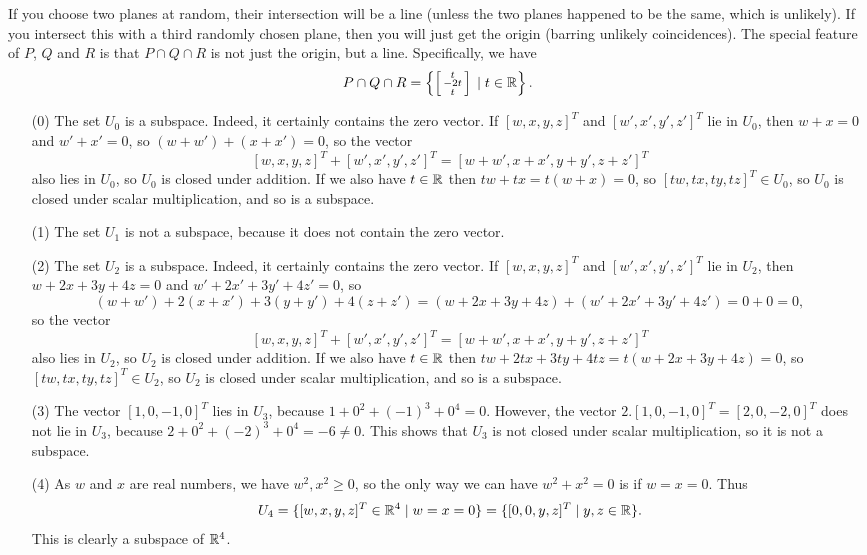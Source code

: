 If you choose two planes at random, their intersection will
 be a line (unless the two planes happened to be the same,
 which is unlikely).  If you intersect this with a third
 randomly chosen plane, then you will just get the origin
 (barring unlikely coincidences).  The special feature of
 $P$, $Q$ and $R$ is that $P\cap Q\cap R$ is not just the
 origin, but a line.  Specifically, we have
 \[ P\cap Q\cap R =
      \left\{\left[\begin{smallmatrix} t\\ -2t\\ t\end{smallmatrix}\right] \;|\; t\in{\mathbb{R}}\right\}.
 \]
\EndDeferredSolution

 \begin{itemize}
  \item[(0)] The set $U_0$ is a subspace.  Indeed, it
   certainly contains the zero vector.  If $[w,x,y,z]^T$ and
   $[w',x',y',z']^T$ lie in $U_0$, then $w+x=0$ and $w'+x'=0$,
   so $(w+w')+(x+x')=0$, so the vector
   \[ [w,x,y,z]^T+[w',x',y',z']^T=[w+w',x+x',y+y',z+z']^T \]
   also lies in $U_0$, so $U_0$ is closed under addition.
   If we also have $t\in{\mathbb{R}}$ then $tw+tx=t(w+x)=0$, so
   $[tw,tx,ty,tz]^T\in U_0$, so $U_0$ is closed under scalar
   multiplication, and so is a subspace.
  \item[(1)] The set $U_1$ is not a subspace, because it
   does not contain the zero vector.
  \item[(2)] The set $U_2$ is a subspace.  Indeed, it
   certainly contains the zero vector.  If $[w,x,y,z]^T$ and
   $[w',x',y',z']^T$ lie in $U_2$, then $w+2x+3y+4z=0$ and
   $w'+2x'+3y'+4z'=0$, so
   \[ (w+w')+2(x+x')+3(y+y')+4(z+z') =
      (w+2x+3y+4z)+(w'+2x'+3y'+4z') = 0+0 = 0,
   \]
   so the vector
   \[ [w,x,y,z]^T+[w',x',y',z']^T=[w+w',x+x',y+y',z+z']^T \]
   also lies in $U_2$, so $U_2$ is closed under addition.  If we
   also have $t\in{\mathbb{R}}$ then $tw+2tx+3ty+4tz=t(w+2x+3y+4z)=0$,
   so $[tw,tx,ty,tz]^T\in U_2$, so $U_2$ is closed under
   scalar multiplication, and so is a subspace.
  \item[(3)] The vector $[1,0,-1,0]^T$ lies in $U_3$, because
   $1+0^2+(-1)^3+0^4=0$.  However, the vector
   $2.[1,0,-1,0]^T=[2,0,-2,0]^T$ does not lie in $U_3$, because
   $2+0^2+(-2)^3+0^4=-6\neq 0$.  This shows that $U_3$ is
   not closed under scalar multiplication, so it is not a
   subspace.
  \item[(4)] As $w$ and $x$ are real numbers, we have
   $w^2,x^2\geq 0$, so the only way we can have $w^2+x^2=0$
   is if $w=x=0$.  Thus
   \[ U_4 = \{[w,x,y,z]^T\in{\mathbb{R}}^4\;|\; w=x=0\} =
            \{[0,0,y,z]^T\;|\; y,z\in{\mathbb{R}}\}.
   \]
   This is clearly a subspace of ${\mathbb{R}}^4$.
 \end{itemize}
\EndDeferredSolution

